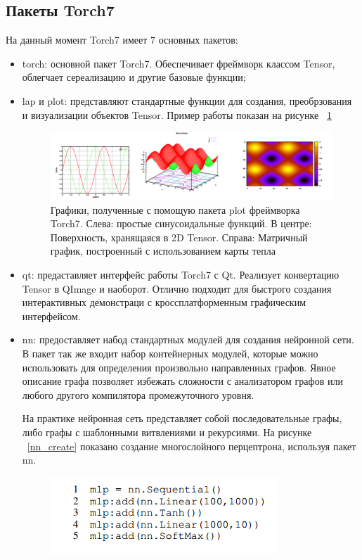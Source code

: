 \documentclass[a4paper,english,russian]{G2-105}
\begin{document}
\subsection{Пакеты Torch7}
\par На данный момент Torch7 имеет 7 основных пакетов:
\begin{itemize}
\item torch: основной пакет Torch7. Обеспечивает фреймворк классом Tensor, облегчает сереализацию и другие базовые функции;
\item lap и plot: представляют стандартные функции для создания, преобрзования и визуализации объектов Tensor. Пример работы показан на рисунке ~\ref{torch_plots}
\begin{figure}
    \includegraphics[width=\linewidth]{torch_plots.png}
    \caption{Графики, полученные с помощую пакета plot фреймворка Torch7. Слева: простые синусоидальные функций. В центре: Поверхность, хранящаяся в 2D Tensor. Справа: Матричный график, построенный с использованием карты тепла}
	\label{torch_plots}
\end{figure}
\item qt: предаставляет интерфейс работы Torch7 с Qt. Реализует конвертацию Tensor в QImage и наоборот. Отлично подходит для быстрого создания интерактивных демонстраци с кроссплатформенным графическим интерфейсом.
\item nn: предоставляет набод стандартных модулей для создания нейронной сети. В пакет так же входит набор контейнерных модулей, которые можно использовать для определения произвольно направленных графов. Явное описание графа позволяет избежать сложности с анализатором графов или любого другого компилятора промежуточного уровня.
\par На практике нейронная сеть представляет собой последовательные графы, либо графы с шаблонными витвлениями и рекурсиями. На рисунке ~\ref{nn_create} показано создание многослойного перцептрона, используя пакет nn.
\begin{figure}
    \includegraphics[width=0.3\paperheight]{nn_create.png}

\end{figure}
\end{itemize}
\end{document}

